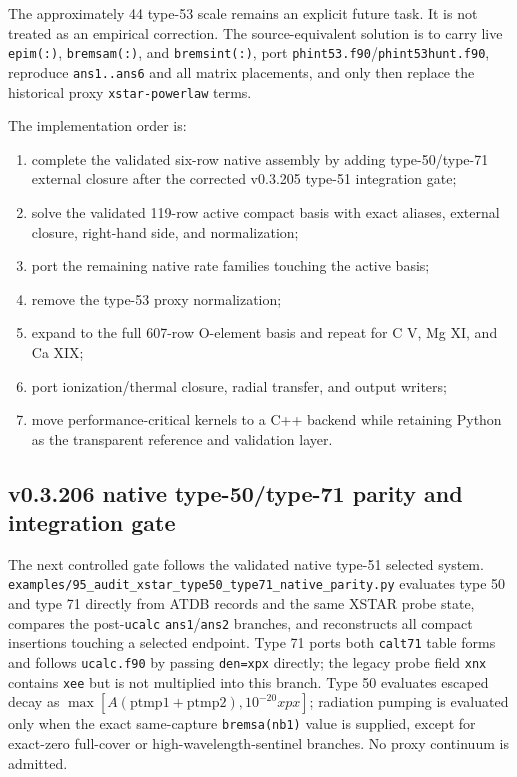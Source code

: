 \documentclass[11pt]{article}
\begin{document}
The approximately 44 type-53 scale remains an explicit future task. It is not treated as an empirical correction. The source-equivalent solution is to carry live \texttt{epim(:)}, \texttt{bremsam(:)}, and \texttt{bremsint(:)}, port \texttt{phint53.f90}/\texttt{phint53hunt.f90}, reproduce \texttt{ans1..ans6} and all matrix placements, and only then replace the historical proxy \texttt{xstar-powerlaw} terms.

The implementation order is:
\begin{enumerate}
\item complete the validated six-row native assembly by adding type-50/type-71 external closure after the corrected v0.3.205 type-51 integration gate;
\item solve the validated 119-row active compact basis with exact aliases, external closure, right-hand side, and normalization;
\item port the remaining native rate families touching the active basis;
\item remove the type-53 proxy normalization;
\item expand to the full 607-row O-element basis and repeat for C V, Mg XI, and Ca XIX;
\item port ionization/thermal closure, radial transfer, and output writers;
\item move performance-critical kernels to a C++ backend while retaining Python as the transparent reference and validation layer.
\end{enumerate}


\subsection{v0.3.206 native type-50/type-71 parity and integration gate}

The next controlled gate follows the validated native type-51 selected system. \texttt{examples/95\_audit\_xstar\_type50\_type71\_native\_parity.py} evaluates type 50 and type 71 directly from ATDB records and the same XSTAR probe state, compares the post-\texttt{ucalc} \texttt{ans1}/\texttt{ans2} branches, and reconstructs all compact insertions touching a selected endpoint. Type 71 ports both \texttt{calt71} table forms and follows \texttt{ucalc.f90} by passing \texttt{den=xpx} directly; the legacy probe field \texttt{xnx} contains \texttt{xee} but is not multiplied into this branch. Type 50 evaluates escaped decay as $\max[A(\mathrm{ptmp1}+\mathrm{ptmp2}),10^{-20}xpx]$; radiation pumping is evaluated only when the exact same-capture \texttt{bremsa(nb1)} value is supplied, except for exact-zero full-cover or high-wavelength-sentinel branches. No proxy continuum is admitted.
\end{document}
